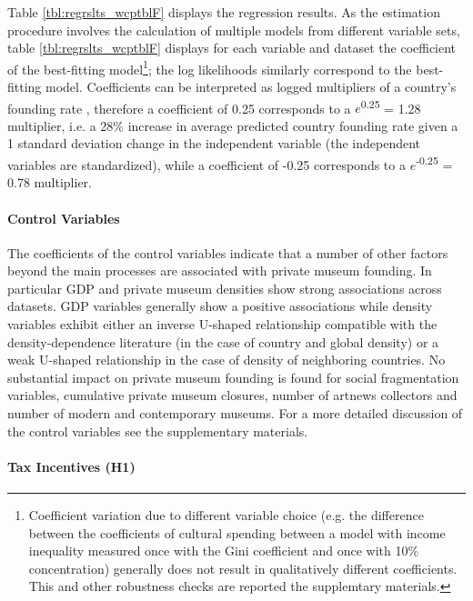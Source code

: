 \documentclass[11pt, authoryear]{elsarticle}
\begin{document}
Table \ref{tbl:regrslts_wcptblF} displays the regression results. 
As the estimation procedure involves the calculation of multiple models from different variable sets, table \ref{tbl:regrslts_wcptblF} displays for each variable and dataset the coefficient of the best-fitting model\footnote{Coefficient variation due to different variable choice (e.g. the difference between the coefficients of cultural spending between a model with income inequality measured once with the Gini coefficient and once with 10\% concentration) generally does not result in qualitatively different coefficients. This and other robustness checks are reported the supplemtary materials.}; the log likelihoods similarly correspond to the best-fitting model. 
Coefficients can be interpreted as logged multipliers of a country's founding rate \citep{Coxe_West_Aiken_2009_count}, therefore a coefficient of 0.25 corresponds to a \(e\)\textsuperscript{0.25} = 1.28 multiplier, i.e. a 28\% increase in average predicted country founding rate given a 1 standard deviation change in the independent variable (the independent variables are standardized), while a coefficient of -0.25 corresponds to a \(e\)\textsuperscript{-0.25} = 0.78 multiplier.
\FloatBarrier

\paragraph*{Control Variables}

The coefficients of the control variables indicate that a number of other factors beyond the main processes are associated with private museum founding.
In particular GDP and private museum densities show strong associations across datasets.
GDP variables generally show a positive associations while density variables exhibit either an inverse U-shaped relationship compatible with the density-dependence literature (in the case of country and global density) or a weak U-shaped relationship in the case of density of neighboring countries.
No substantial impact on private museum founding is found for social fragmentation variables, cumulative private museum closures, number of artnews collectors and number of modern and contemporary museums.
For a more detailed discussion of the control variables see the supplementary materials. 



\paragraph*{Tax Incentives (H1)}
\end{document}
